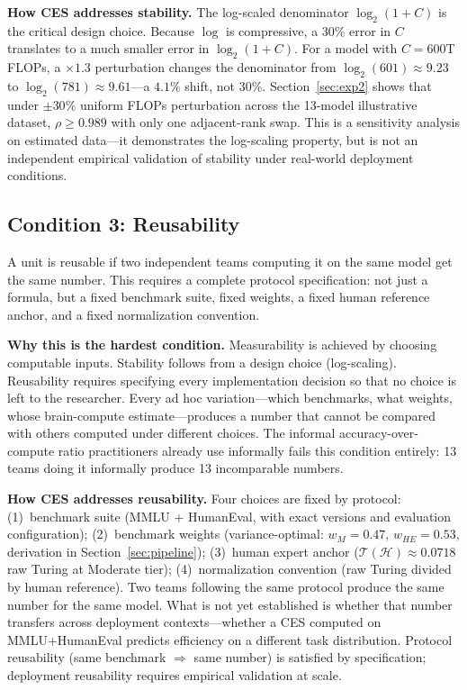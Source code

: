 \documentclass[12pt]{article}
\begin{document}
\textbf{How CES addresses stability.} The log-scaled denominator $\log_2(1+C)$ is the
critical design choice. Because $\log$ is compressive, a 30\% error in $C$ translates to
a much smaller error in $\log_2(1+C)$. For a model with $C=600$T FLOPs, a $\times1.3$
perturbation changes the denominator from $\log_2(601) \approx 9.23$ to $\log_2(781)
\approx 9.61$---a $4.1\%$ shift, not 30\%. Section~\ref{sec:exp2} shows that under
$\pm30\%$ uniform FLOPs perturbation across the 13-model illustrative dataset, $\rho \geq
0.989$ with only one adjacent-rank swap. This is a sensitivity analysis on estimated
data---it demonstrates the log-scaling property, but is not an independent empirical
validation of stability under real-world deployment conditions.

\subsection{Condition 3: Reusability}

A unit is reusable if two independent teams computing it on the same model get the same
number. This requires a complete protocol specification: not just a formula, but a fixed
benchmark suite, fixed weights, a fixed human reference anchor, and a fixed normalization
convention.

\textbf{Why this is the hardest condition.} Measurability is achieved by choosing computable
inputs. Stability follows from a design choice (log-scaling). Reusability requires
specifying every implementation decision so that no choice is left to the researcher. Every
ad hoc variation---which benchmarks, what weights, whose brain-compute estimate---produces a
number that cannot be compared with others computed under different choices. The informal
accuracy-over-compute ratio practitioners already use informally fails this condition
entirely: 13 teams doing it informally produce 13 incomparable numbers.

\textbf{How CES addresses reusability.} Four choices are fixed by protocol: (1)~benchmark
suite (MMLU + HumanEval, with exact versions and evaluation configuration);
(2)~benchmark weights (variance-optimal: $w_M = 0.47$, $w_{HE} = 0.53$, derivation in
Section~\ref{sec:pipeline}); (3)~human expert anchor ($\mathcal{T}(\mathcal{H}) \approx
0.0718$ raw Turing at Moderate tier); (4)~normalization convention (raw Turing divided by
human reference). Two teams following the same protocol produce the same number for the
same model. What is not yet established is whether that number transfers across deployment
contexts---whether a CES computed on MMLU+HumanEval predicts efficiency on a different
task distribution. Protocol reusability (same benchmark $\Rightarrow$ same number) is
satisfied by specification; deployment reusability requires empirical validation at scale.
\end{document}
